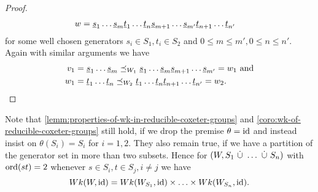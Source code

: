 \begin{coro}
\begin{proof}
\begin{align*}
			w	& = \underline{s}_1 \ldots \underline{s}_m \underline{t}_1 \ldots \underline{t}_n \underline{s}_{m+1} \ldots \underline{s}_{m'} \underline{t}_{n+1} \ldots \underline{t}_{n'}
		\end{align*}
		for some well chosen generators $s_i \in S_1, t_i \in S_2$ and $0 \leq m \leq m', 0 \leq n \leq n'$. Again with similar arguments we have 
		\begin{align*}
			v_1	& = \underline{s}_1 \ldots \underline{s}_m \preceq_{W_1} \underline{s}_1 \ldots \underline{s}_m \underline{s}_{m+1} \ldots \underline{s}_{m'} = w_1 \textrm{ and} \\
			w_1	& = \underline{t}_1 \ldots \underline{t}_n \preceq_{W_2} \underline{t}_1 \ldots \underline{t}_n \underline{t}_{n+1} \ldots \underline{t}_{n'} = w_2. \qedhere
		\end{align*}
	\end{proof}
\end{coro}

\begin{rema}
	Note that \ref{lemm:properties-of-wk-in-reducible-coxeter-groups} and \ref{coro:wk-of-reducible-coxeter-groups} still hold, if we drop the premise $\theta = \operatorname{id}$ and instead insist on $\theta(S_i) = S_i$ for $i=1,2$. They also remain true, if we have a partition of the generator set in more than two subsets. Hence for $(W,S_1 \ \dot \cup \  \ldots \ \dot \cup \  S_n)$ with $\operatorname{ord}(st) = 2$ whenever $s \in S_i, t \in S_j, i \neq j$ we have
	$$ Wk(W,\operatorname{id}) = Wk(W_{S_1},\operatorname{id}) \times \ldots \times Wk(W_{S_n},\operatorname{id}). $$
\end{rema}

